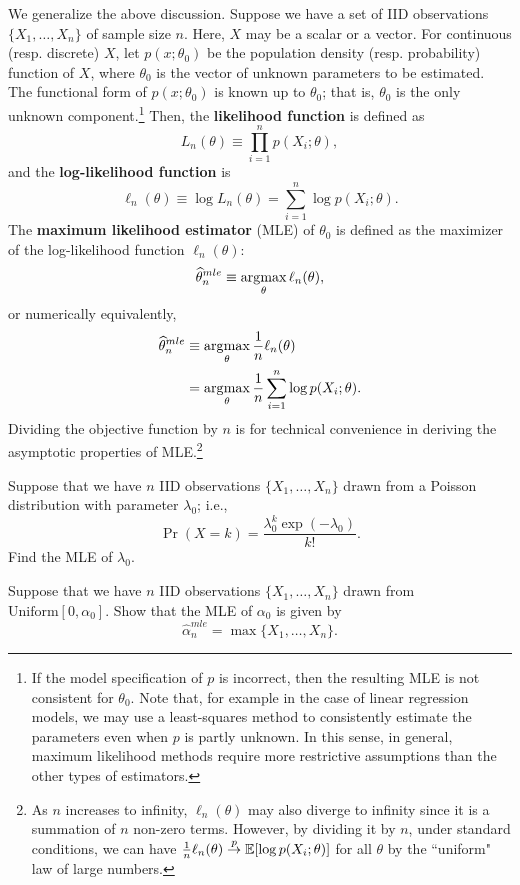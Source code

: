 \documentclass[11pt, A4paper, openany, uplatex]{book}
\begin{document}
We generalize the above discussion.
Suppose we have a set of IID observations $\{X_1, \ldots, X_n\}$ of sample size $n$.
Here, $X$ may be a scalar or a vector.
For continuous (resp. discrete) $X$, let $p(x ; \theta_0)$ be the population density (resp. probability) function of $X$, where $\theta_0$ is the vector of unknown parameters to be estimated.
The functional form of $p(x ; \theta_0)$ is known up to $\theta_0$; that is, $\theta_0$ is the only unknown component.\footnote{
	If the model specification of $p$ is incorrect, then the resulting MLE is not consistent for $\theta_0$.
	Note that, for example in the case of linear regression models, we may use a least-squares method to consistently estimate the parameters even when $p$ is partly unknown.
	In this sense, in general, maximum likelihood methods require more restrictive assumptions than the other types of estimators.
	}
Then, the \textbf{likelihood function} is defined as
\[
	L_n(\theta) \equiv \prod_{i = 1}^n p(X_i; \theta),
\]
and the \textbf{log-likelihood function} is
\[
	\ell_n(\theta) \equiv \log L_n(\theta) = \sum_{i = 1}^n \log p(X_i; \theta).
\]
The \textbf{maximum likelihood estimator} (MLE) of $\theta_0$ is defined as the maximizer of the log-likelihood function $\ell_n(\theta)$: 
\[
	\widehat \theta_n^{mle} \equiv \operatorname*{\arg\!\max}_{\theta}\ell_n(\theta),
\]
or numerically equivalently,
\begin{align*}
	\widehat \theta_n^{mle} 
	& \equiv \operatorname*{\arg\!\max}_{\theta} \frac{1}{n} \ell_n(\theta) \\ 
	& = \operatorname*{\arg\!\max}_{\theta} \frac{1}{n} \sum_{i = 1}^n \log p(X_i; \theta).
\end{align*}
Dividing the objective function by $n$ is for technical convenience in deriving the asymptotic properties of MLE.\footnote{
	As $n$ increases to infinity, $\ell_n(\theta)$ may also diverge to infinity since it is a summation of $n$ non-zero terms.
	However, by dividing it by $n$, under standard conditions, we can have $\frac{1}{n} \ell_n(\theta) \overset{p}{\to} \mathbb{E}[\log p(X_i; \theta)]$ for all $\theta$ by the ``uniform" law of large numbers.\label{foot:UWLLN}
	}

\hrulefill
\begin{exercise}\upshape
	Suppose that we have $n$ IID observations $\{X_1, \ldots, X_n\}$ drawn from a Poisson distribution with parameter $\lambda_0$; i.e.,
	\[
		\Pr(X = k) = \frac{\lambda_0^k \exp(-\lambda_0)}{k !}.
	\]
	Find the MLE of $\lambda_0$.
\end{exercise}
\begin{exercise}\label{ex:maxuni}\upshape
	Suppose that we have $n$ IID observations $\{X_1, \ldots, X_n\}$ drawn from $\text{Uniform}[0, \alpha_0]$.
	Show that the MLE of $\alpha_0$ is given by 
	\[
	\hat \alpha_n^{mle} = \max\{X_1, \ldots, X_n\}. 
	\] 
\end{exercise}
\end{document}
